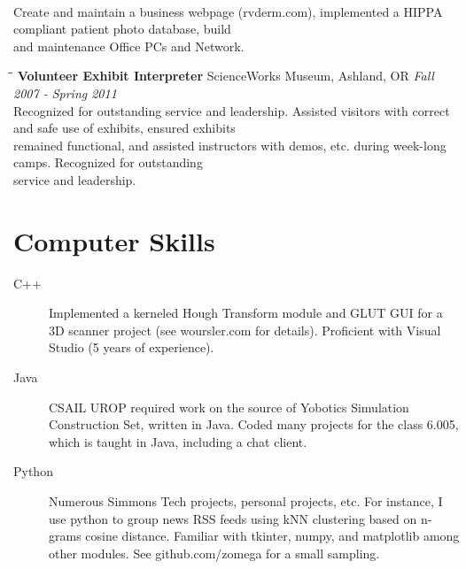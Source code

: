 \documentclass{res}
\begin{document}
\begin{resume}
\begin{tabbing}
				\\Create and maintain a business webpage (rvderm.com), implemented a HIPPA compliant patient photo database, build
				\\and maintenance Office PCs and Network.

			\end{tabbing}\vspace{-20pt}

			\begin{tabbing}
				\hspace{2.3in}\= \hspace{2.6in}\= \kill %
				{\bf Volunteer Exhibit Interpreter}	\>ScienceWorks Museum, Ashland, OR	\> \textit{Fall 2007 - Spring 2011}
				\\Recognized for outstanding service and leadership. Assisted visitors with correct and safe use of exhibits, ensured exhibits
				\\ remained functional, and assisted instructors with demos, etc. during week-long camps. Recognized for outstanding
				\\ service and leadership.

			\end{tabbing}\vspace{-20pt}

		\section{Computer Skills}

			\begin{description}

				\item[C++] Implemented a kerneled Hough Transform module and GLUT GUI for a 3D scanner project (see woursler.com for details). Proficient with Visual Studio (5 years of experience).

				\item[Java] CSAIL UROP required work on the source of Yobotics Simulation Construction Set, written in Java. Coded many projects for the class 6.005, which is taught in Java, including a chat client.

				\item[Python] Numerous Simmons Tech projects, personal projects, etc. For instance, I use python to group news RSS feeds using kNN clustering based on n-grams cosine distance. Familiar with tkinter, numpy, and matplotlib among other modules. See github.com/zomega for a small sampling.


\end{description}
\end{resume}
\end{document}
